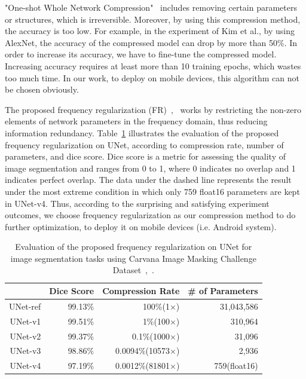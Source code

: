 \documentclass[runningheads]{llncs}
\begin{document}
"One-shot Whole Network Compression"~\cite{kim2016oneshot} includes removing certain parameters or structures, which is irreversible. Moreover, by using this compression method, the accuracy is too low. For example, in the experiment of Kim et al., by using AlexNet, the accuracy of the compressed model can drop by more than 50\%. In order to increase its accuracy, we have to fine-tune the compressed model. Increasing accuracy requires at least more than 10 training epochs, which wastes too much time. In our work, to deploy on mobile devices, this algorithm can not be chosen obviously. 


The proposed frequency regularization (FR)~\cite{zhao2023fr},~\cite{fr_repo} works by restricting the non-zero elements of network parameters in the frequency domain, thus reducing information redundancy. Table~\ref{table:fr_unet} illustrates the evaluation of the proposed frequency regularization on UNet, according to compression rate, number of parameters, and dice score. Dice score is a metric for assessing the quality of image segmentation and ranges from 0 to 1, where 0 indicates no overlap and 1 indicates perfect overlap. The data under the dashed line represents the result under the most extreme condition in which only 759 float16 parameters are kept in UNet-v4. Thus, according to the surprising and satisfying experiment outcomes, we choose frequency regularization as our compression method to do further optimization, to deploy it on mobile devices (i.e. Android system).

\begin{table}[H]
	\caption{Evaluation of the proposed frequency regularization on UNet for image segmentation tasks using Carvana Image Masking Challenge Dataset~\cite{zhao2023fr},~\cite{brian2017carvanadataset}.} 
	\label{table:fr_unet}
	\small
	\centering
	\begin{tabular}{rrrr}
		\toprule
		&Dice Score&Compression Rate&\# of Parameters\\ 
		\midrule\midrule
		UNet-ref&99.13\%&100\%(1×)&31,043,586\\
		UNet-v1&99.51\%&1\%(100×)&310,964\\
		UNet-v2&99.37\%&0.1\%(1000×)&31,096\\
		UNet-v3&98.86\%&0.0094\%(10573×)&2,936\\
		\cdashline{1-4}
		UNet-v4&97.19\%&0.0012\%(81801×)&759(float16)\\
		\bottomrule
	\end{tabular}
\end{table}
\end{document}
